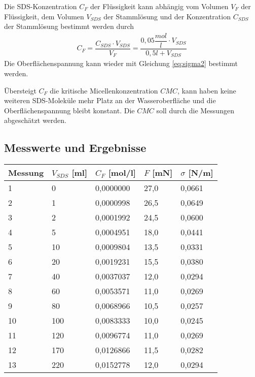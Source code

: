 \documentclass{scrartcl}
\begin{document}
Die SDS-Konzentration $C_{F}$ der Flüssigkeit kann abhängig vom Volumen $V_{F}$ der Flüssigkeit, dem Volumen $V_{SDS}$ der Stammlösung und der Konzentration $C_{SDS}$ der Stammlösung bestimmt werden durch
\begin{align}
C_{F} = \dfrac{C_{SDS} \cdot V_{SDS}}{V_{F}} = \dfrac{0,05 \dfrac{mol}{l} \cdot V_{SDS}}{0,5l + V_{SDS}}
\end{align}
Die Oberflächenspannung kann wieder mit Gleichung \ref{eq:sigma2} bestimmt werden.

Übersteigt $C_{F}$ die kritische Micellenkonzentration $CMC$, kann haben keine weiteren SDS-Moleküle mehr Platz an der Wasseroberfläche und die Oberflächenspannung bleibt konstant. Die $CMC$ soll durch die Messungen abgeschätzt werden.
\subsection{Messwerte und Ergebnisse}
\begin{table}[H]
\begin{center}
\begin{tabular}{l|l|l|l|l}
Messung & $V_{SDS}$ [ml]    & $C_{F}$ [mol/l]          & $F$ [mN]     & $\sigma$ [N/m]       \\
\hline
1       & 0   & 0,0000000 & 27,0 & 0,0661 \\
2       & 1   & 0,0000998 & 26,5 & 0,0649 \\
3       & 2   & 0,0001992 & 24,5 & 0,0600 \\
4       & 5   & 0,0004951 & 18,0 & 0,0441 \\
5       & 10  & 0,0009804 & 13,5 & 0,0331 \\
6       & 20  & 0,0019231 & 15,5 & 0,0380 \\
7       & 40  & 0,0037037 & 12,0 & 0,0294 \\
8       & 60  & 0,0053571 & 11,0 & 0,0269 \\
9       & 80  & 0,0068966 & 10,5 & 0,0257 \\
10      & 100 & 0,0083333 & 10,0 & 0,0245 \\
11      & 120 & 0,0096774 & 11,0 & 0,0269 \\
12      & 170 & 0,0126866 & 11,5 & 0,0282 \\
13      & 220 & 0,0152778 & 12,0 & 0,0294
\end{tabular}
\end{center}
\label{tab:SDS}
\end{table}
\end{document}

